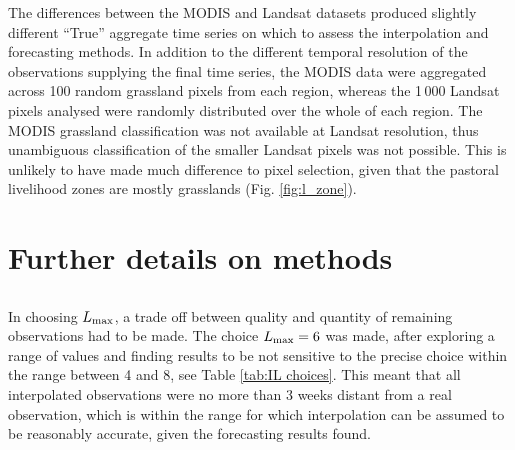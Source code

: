 \documentclass[review]{elsarticle}
\begin{document}
The differences between the MODIS and Landsat datasets produced slightly different “True” aggregate time series on which to assess the interpolation and forecasting methods. In addition to the different temporal resolution of the observations supplying the final time series, the MODIS data were aggregated across 100 random grassland pixels from each region, whereas the 1\,000 Landsat pixels analysed were randomly distributed over the whole of each region.  The MODIS grassland classification was not available at Landsat resolution, thus unambiguous classification of the smaller Landsat pixels was not possible. This is unlikely to have made much difference to pixel selection, given that the pastoral livelihood zones are mostly grasslands (Fig. \ref{fig:l_zone}). 

\section{Further details on methods}



\subsection{} \label{sec:Lmax}
 In choosing $L_{\rm{max}}$, a trade off between quality and quantity of remaining observations had to be made. The choice $L_{\rm{max}}=6$ was made, after exploring a range of values and finding results to be not sensitive to the precise choice within the range between 4 and 8, see Table \ref{tab:IL choices}. This meant that all interpolated observations were no more than 3 weeks distant from a real observation, which is within the range for which interpolation can be assumed to be reasonably accurate, given the forecasting results found. 
\end{document}
